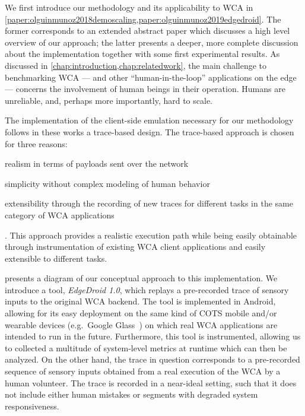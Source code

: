 We first introduce our methodology and its applicability to \gls{WCA} in \cref{paper:olguinmunoz2018demoscaling,paper:olguinmunoz2019edgedroid}.
The former corresponds to an extended abstract paper which discusses a high level overview of our approach;
the latter presents a deeper, more complete discussion about the implementation together with some first experimental results.
As discussed in \cref{chap:introduction,chap:relatedwork}, the main challenge to benchmarking \gls{WCA} --- and other ``human-in-the-loop'' applications on the edge --- concerns the involvement of human beings in their operation.
Humans are unreliable, and, perhaps more importantly, hard to scale.

The implementation of the client-side emulation necessary for our methodology follows in these works a trace-based design.
The trace-based approach is chosen for three reasons:
\begin{inlineenum}
    \item realism in terms of payloads sent over the network
    \item simplicity without complex modeling of human behavior
    \item extensibility through the recording of new traces for different tasks in the same category of WCA applications
\end{inlineenum}.
This approach provides a realistic execution path while being easily obtainable through instrumentation of existing WCA client applications and easily extensible to different tasks.

 presents a diagram of our conceptual approach to this implementation.
We introduce a tool, \emph{EdgeDroid \num{1.0}}, which replays a pre-recorded trace of sensory inputs to the original \gls{WCA} backend.
The tool is implemented in Android, allowing for its easy deployment on the same kind of \gls{COTS} mobile and/or wearable devices (e.g.\ Google Glass~\cite{googleglass}) on which real \gls{WCA} applications are intended to run in the future.
Furthermore, this tool is instrumented, allowing us to collected a multitude of system-level metrics at runtime which can then be analyzed.
On the other hand, the trace in question corresponds to a pre-recorded sequence of sensory inputs obtained from a real execution of the \gls{WCA} by a human volunteer.
The trace is recorded in a near-ideal setting, such that it does not include either human mistakes or segments with degraded system responsiveness.

